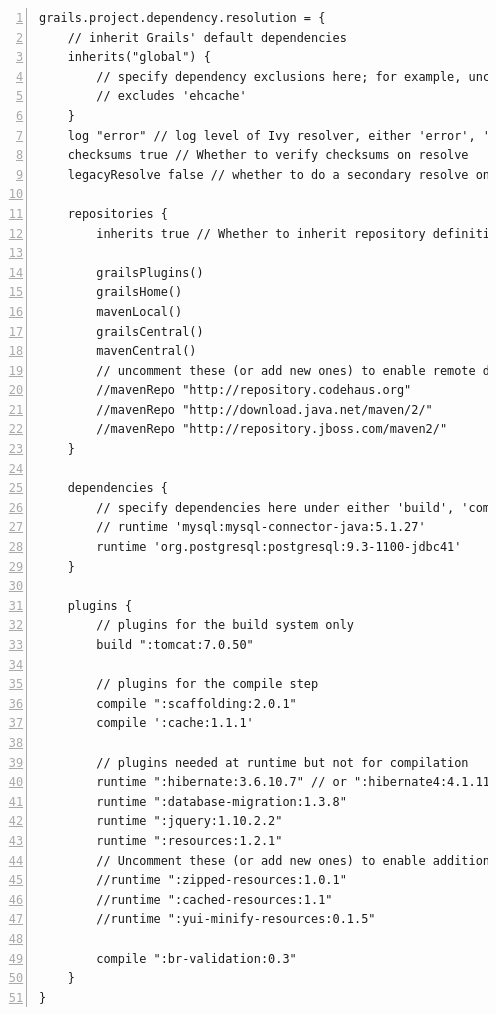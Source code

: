 \begin{lstlisting}[numbers=left, caption={\bf BuildConfig.groovy}, frame = trBL,
    float=htbp, label=codBuildConfig] 
grails.project.dependency.resolution = {
    // inherit Grails' default dependencies
    inherits("global") {
        // specify dependency exclusions here; for example, uncomment this to disable ehcache:
        // excludes 'ehcache'
    }
    log "error" // log level of Ivy resolver, either 'error', 'warn', 'info', 'debug' or 'verbose'
    checksums true // Whether to verify checksums on resolve
    legacyResolve false // whether to do a secondary resolve on plugin installation, not advised and here for backwards compatibility

    repositories {
        inherits true // Whether to inherit repository definitions from plugins

        grailsPlugins()
        grailsHome()
        mavenLocal()
        grailsCentral()
        mavenCentral()
        // uncomment these (or add new ones) to enable remote dependency resolution from public Maven repositories
        //mavenRepo "http://repository.codehaus.org"
        //mavenRepo "http://download.java.net/maven/2/"
        //mavenRepo "http://repository.jboss.com/maven2/"
    }

    dependencies {
        // specify dependencies here under either 'build', 'compile', 'runtime', 'test' or 'provided' scopes e.g.
        // runtime 'mysql:mysql-connector-java:5.1.27'
        runtime 'org.postgresql:postgresql:9.3-1100-jdbc41'
    }

    plugins {
        // plugins for the build system only
        build ":tomcat:7.0.50"

        // plugins for the compile step
        compile ":scaffolding:2.0.1"
        compile ':cache:1.1.1'

        // plugins needed at runtime but not for compilation
        runtime ":hibernate:3.6.10.7" // or ":hibernate4:4.1.11.6"
        runtime ":database-migration:1.3.8"
        runtime ":jquery:1.10.2.2"
        runtime ":resources:1.2.1"
        // Uncomment these (or add new ones) to enable additional resources capabilities
        //runtime ":zipped-resources:1.0.1"
        //runtime ":cached-resources:1.1"
        //runtime ":yui-minify-resources:0.1.5"
        
        compile ":br-validation:0.3"
    }
}
\end{lstlisting}

\newpage

